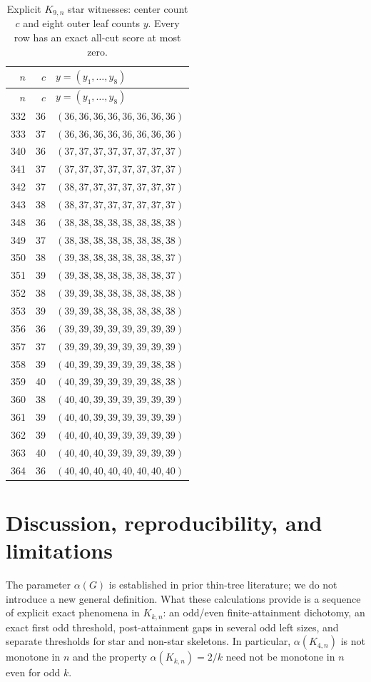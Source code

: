 \documentclass[11pt,a4paper]{article}
\newcommand{\al}{\alpha}
\newcommand{\KK}[2]{K_{#1,#2}}
\begin{document}
\begin{longtable}{@{}r r l@{}}
\caption{Explicit $\KK{9}{n}$ star witnesses: center count $c$ and eight outer leaf counts $y$. Every row has an exact all-cut score at most zero.}\label{tab:k9witness}\\
\toprule $n$&$c$&$y=(y_1,\ldots,y_8)$ \\ \midrule
\endfirsthead
\toprule $n$&$c$&$y=(y_1,\ldots,y_8)$ \\ \midrule
\endhead
332&36&$(36,36,36,36,36,36,36,36)$\\
333&37&$(36,36,36,36,36,36,36,36)$\\
340&36&$(37,37,37,37,37,37,37,37)$\\
341&37&$(37,37,37,37,37,37,37,37)$\\
342&37&$(38,37,37,37,37,37,37,37)$\\
343&38&$(38,37,37,37,37,37,37,37)$\\
348&36&$(38,38,38,38,38,38,38,38)$\\
349&37&$(38,38,38,38,38,38,38,38)$\\
350&38&$(39,38,38,38,38,38,38,37)$\\
351&39&$(39,38,38,38,38,38,38,37)$\\
352&38&$(39,39,38,38,38,38,38,38)$\\
353&39&$(39,39,38,38,38,38,38,38)$\\
356&36&$(39,39,39,39,39,39,39,39)$\\
357&37&$(39,39,39,39,39,39,39,39)$\\
358&39&$(40,39,39,39,39,39,38,38)$\\
359&40&$(40,39,39,39,39,39,38,38)$\\
360&38&$(40,40,39,39,39,39,39,39)$\\
361&39&$(40,40,39,39,39,39,39,39)$\\
362&39&$(40,40,40,39,39,39,39,39)$\\
363&40&$(40,40,40,39,39,39,39,39)$\\
364&36&$(40,40,40,40,40,40,40,40)$\\
\bottomrule
\end{longtable}

\section{Discussion, reproducibility, and limitations}
The parameter $\al(G)$ is established in prior thin-tree literature; we do not introduce a new general definition. What these calculations provide is a sequence of explicit exact phenomena in $\KK{k}{n}$: an odd/even finite-attainment dichotomy, an exact first odd threshold, post-attainment gaps in several odd left sizes, and separate thresholds for star and non-star skeletons. In particular, $\al(\KK{4}{n})$ is not monotone in $n$ and the property $\al(\KK{k}{n})=2/k$ need not be monotone in $n$ even for odd $k$.
\end{document}
